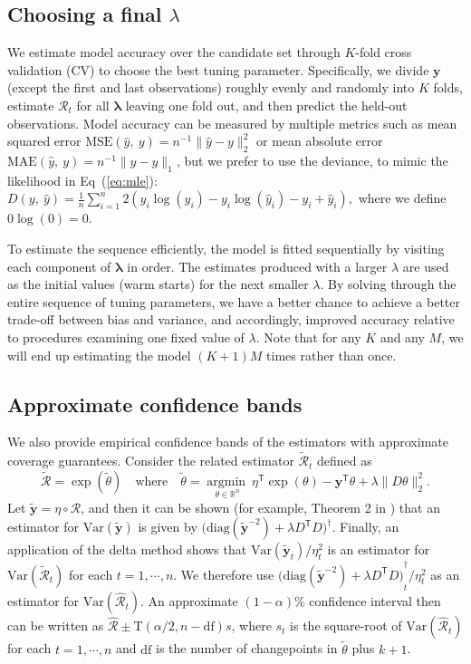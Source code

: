 \documentclass[10pt,letterpaper]{article}
\newcommand{\fr}[1]{\frac{1}{#1}}
\newcommand{\lr}[1]{\left(#1\right)}
\newcommand{\snorm}[1]{\lVert #1 \rVert}
\DeclareMathOperator*{\argmin}{argmin}
\newcommand{\Argmin}[1]{\underset{#1}{\argmin\ }}
\def\Var{\mathrm{Var}}
\def\bfy{\mathbf{y}}
\def\calR{\mathcal{R}}
\def\bbR{\mathbb{R}}
\renewcommand{\top}{\mathsf{T}}
\renewcommand{\eqref}[1]{Eq~(\ref{#1})}
\begin{document}
\subsection{Choosing a final $\lambda$}
\label{sec:cv}

We estimate model accuracy over the candidate set through $K$-fold cross
validation (CV) to choose the best tuning parameter. Specifically, we divide
$\bfy$ (except the first and last observations) roughly evenly and randomly into
$K$ folds, estimate $\calR_t$ for all $\boldsymbol{\lambda}$ leaving one fold
out, and then predict the held-out observations. Model accuracy can be measured
by multiple metrics such as mean squared error $\mathrm{MSE}(\widehat{y},\ y) =
n^{-1}\snorm{\widehat{y} - y}_2^2$ or mean absolute error
$\mathrm{MAE}(\widehat{y},\ y) = n^{-1}\snorm{\widehat{y} - y}_1$, but we prefer
to use the deviance, to mimic the likelihood in \eqref{eq:mle}: $D\lr{y,\
\hat{y}} = \fr{n} \sum_{i=1}^n 2\lr{y_i \log(y_i) - y_i\log(\hat{y}_i) - y_i +
\hat{y}_i},$ where we define $0\log(0) = 0$. 


To estimate the sequence efficiently, the model is fitted sequentially by 
visiting each component of $\boldsymbol{\lambda}$ in order. The estimates 
produced with a larger $\lambda$ are used as the initial values (warm starts) 
for the next smaller $\lambda$. By solving through the entire sequence of tuning 
parameters, we have a better chance to achieve a better trade-off between bias 
and variance, and accordingly, improved accuracy relative to procedures examining 
one fixed value of $\lambda$. Note that for any $K$ and any $M$, we will end up 
estimating the model $(K+1)M$ times rather than once.


\subsection{Approximate confidence bands} 
\label{sec:conf-band} 

We also provide empirical confidence bands of the estimators with  
approximate coverage guarantees. 
Consider the related estimator $\widetilde{\calR}_t$ defined as
$$\widetilde{\calR} = \exp(\widetilde{\theta}) \quad\textrm{where}\quad
\widetilde{\theta} = \Argmin{\theta\in\bbR^n} \eta^\top \exp(\theta) - \bfy^\top
\theta + \lambda \snorm{D \theta}_2^2.$$ 
Let $\widetilde{\bfy} = \eta \circ \calR$, and then it can be shown (for example,
Theorem 2 in \cite{vaiter2017degrees}) that an estimator for
$\Var(\widetilde{\bfy})$ is given by $\big(\mathrm{diag}(\widetilde{\bfy}^{-2})
+ \lambda D^{\top} D\big)^{\dagger}.$ Finally, an
application of the delta method shows that $\Var(\widetilde{\bfy}_t) / \eta_t^2$
is an estimator for $\Var(\widetilde{\calR}_t)$ for each $t = 1, \cdots, n$. We
therefore use ${\big(\mathrm{diag}(\widetilde{\bfy}^{-2}) + \lambda
D^{\top} D\big)}^{\dagger}_t / \eta_t^2$ as an estimator
for $\Var(\widehat{\calR}_t)$. An approximate $(1-\alpha)\%$ confidence interval
then can be written as $\widehat{\calR}\pm \textrm{T}(\alpha/2,n-\textrm{df})s$, 
where $s_t$ is the square-root of $\Var(\widehat{\calR}_t)$ for each 
$t = 1, \cdots, n$ and $\textrm{df}$ is the number of changepoints in 
$\widetilde{\theta}$ plus $k+1$. 
\end{document}
